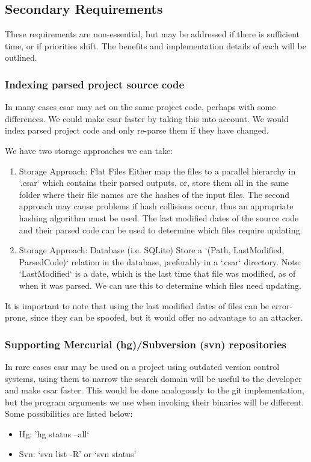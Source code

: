 \documentclass[12pt, letterpaper]{article}
\begin{document}
\subsection{Secondary Requirements}
These requirements are non-essential, but may be addressed if there is sufficient time, or if priorities shift.
The benefits and implementation details of each will be outlined.

\subsubsection{Indexing parsed project source code}
In many cases csar may act on the same project code, perhaps with some differences.
We could make csar faster by taking this into account.
We would index parsed project code and only re-parse them if they have changed.

We have two storage approaches we can take:
\begin{enumerate}
  \item Storage Approach: Flat Files\newline
  Either map the files to a parallel hierarchy in `.csar` which contains their parsed outputs, or, store them all in the same folder where their file names are the hashes of the input files.
  The second approach may cause problems if hash collisions occur, thus an appropriate hashing algorithm must be used.
  The last modified dates of the source code and their parsed code can be used to determine which files require updating.
  \item Storage Approach: Database (i.e. SQLite)\newline
  Store a `(Path, LastModified, ParsedCode)` relation in the database, preferably in a `.csar` directory.
  Note: `LastModified` is a date, which is the last time that file was modified, as of when it was parsed.
  We can use this to determine which files need updating.
\end{enumerate}

It is important to note that using the last modified dates of files can be error-prone, since they can be spoofed, but it would offer no advantage to an attacker.

\subsubsection{Supporting Mercurial (hg)/Subversion (svn) repositories}
In rare cases csar may be used on a project using outdated version control systems, using them to narrow the search domain will be useful to the developer and make csar faster.
This would be done analogously to the git implementation, but the program arguments we use when invoking their binaries will be different.
Some possibilities are listed below:
\begin{itemize}
  \item Hg: 'hg status --all`
  \item Svn: `svn list -R' or `svn status'
\end{itemize}
\end{document}
